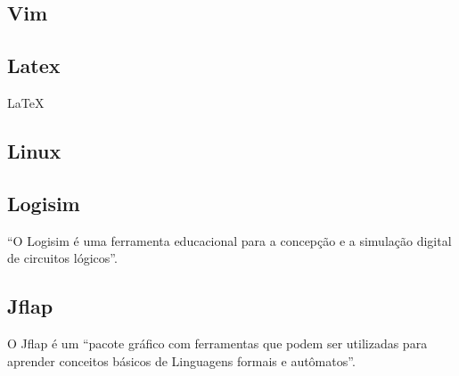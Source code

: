 \documentclass[
	article,			%
	12pt,				%
	oneside,			%
	a4paper,			%
	english,			%
	brazil,				%
	sumario=tradicional
	]{abntex2}
\begin{document}
\subsection{Vim}\label{Editor de texto}

\subsection{Latex}\label{Latex}
\LaTeX

\subsection{Linux}\label{Linux}


\subsection{Logisim}\label{Logisim}
``O Logisim é uma ferramenta educacional para a concepção e a simulação digital de circuitos lógicos''\cite{site_logisim}.

\subsection{Jflap}\label{Jflap}
O Jflap é um ``pacote gráfico com ferramentas que podem ser utilizadas para aprender conceitos básicos de Linguagens formais e autômatos''\cite{site_jflap}.

\postextual

\cleardoublepage


%
%
\end{document}
